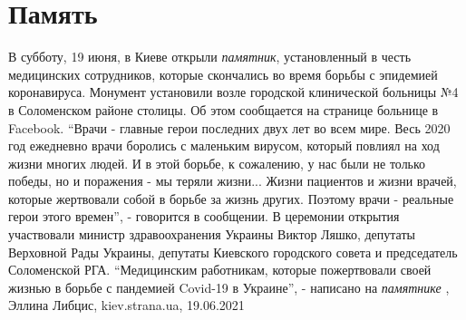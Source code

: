  
 
 
 
 
\chapter{Память}
\label{sec:slova.pamjat}

В субботу, 19 июня, в Киеве открыли \emph{памятник}, установленный в честь
медицинских сотрудников, которые скончались во время борьбы с эпидемией
коронавируса.  Монумент установили возле городской клинической больницы №4 в
Соломенском районе столицы.  Об этом сообщается на странице больнице в
Facebook.  \enquote{Врачи - главные герои последних двух лет во всем мире. Весь
2020 год ежедневно врачи боролись с маленьким вирусом, который повлиял на ход
жизни многих людей. И в этой борьбе, к сожалению, у нас были не только победы,
но и поражения - мы теряли жизни... Жизни пациентов и жизни врачей, которые
жертвовали собой в борьбе за жизнь других. Поэтому врачи - реальные герои этого
времен}, - говорится в сообщении.  В церемонии открытия участвовали министр
здравоохранения Украины Виктор Ляшко, депутаты Верховной Рады Украины, депутаты
Киевского городского совета и председатель Соломенской РГА.
\enquote{Медицинским работникам, которые пожертвовали своей жизнью в борьбе с
пандемией Covid-19 в Украине}, - написано на \emph{памятнике}
, 
Эллина Либцис, kiev.strana.ua, 19.06.2021

